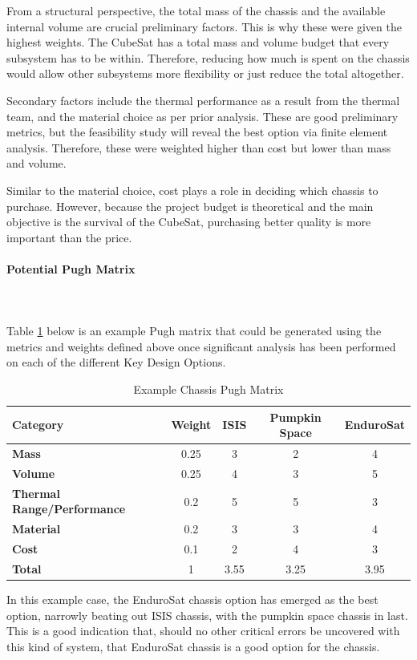 From a structural perspective, the total mass of the chassis and the available internal volume are crucial preliminary factors. This is why these were given the highest weights. The CubeSat has a total mass and volume budget that every subsystem has to be within. Therefore, reducing how much is spent on the chassis would allow other subsystems more flexibility or just reduce the total altogether. 

Secondary factors include the thermal performance as a result from the thermal team, and the material choice as per prior analysis. These are good preliminary metrics, but the feasibility study will reveal the best option via finite element analysis. Therefore, these were weighted higher than cost but lower than mass and volume.

Similar to the material choice, cost plays a role in deciding which chassis to purchase. However, because the project budget is theoretical and the main objective is the survival of the CubeSat, purchasing better quality is more important than the price. 

\paragraph{Potential Pugh Matrix} ~\\~\\

Table \ref{tbl:chassis_Pugh} below is an example Pugh matrix that could be generated using the metrics and weights defined above once significant analysis has been performed on each of the different Key Design Options. 
\begin{table}[H]
\centering
\begin{tabular}{|l|c|c|c|c|} 
\hline
    \textbf{Category} & \textbf{Weight} & \textbf{ISIS} & \textbf{Pumpkin Space} & \textbf{EnduroSat}
    \\
\hline
    \textbf{Mass} & 0.25 & 3 & 2 & 4
    \\
\hline
    \textbf{Volume} & 0.25 & 4 & 3 & 5
    \\
\hline
    \textbf{Thermal Range/Performance} & 0.2 & 5 & 5 & 3
    \\
\hline
    \textbf{Material} & 0.2 & 3 & 3 & 4
    \\
\hline
    \textbf{Cost} & 0.1 & 2 & 4 & 3
    \\
\hline
    \textbf{Total} & 1 & 3.55 & 3.25 & 3.95
    \\
\hline
\end{tabular}
\caption{Example Chassis Pugh Matrix }
\label{tbl:chassis_Pugh}
\end{table}

In this example case, the EnduroSat chassis option has emerged as the best option, narrowly beating out ISIS chassis, with the pumpkin space chassis in last. This is a good indication that, should no other critical errors be uncovered with this kind of system, that EnduroSat chassis is a good option for the chassis.
